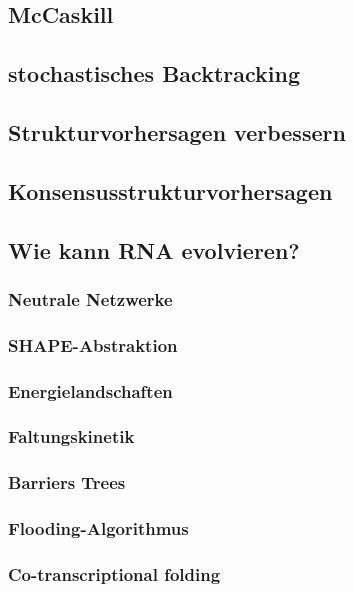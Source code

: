 \documentclass[12pt]{article}
\begin{document}
\subsection{McCaskill}

\subsection{stochastisches Backtracking}

\subsection{Strukturvorhersagen verbessern}

\subsection{Konsensusstrukturvorhersagen}

\subsection{Wie kann RNA evolvieren?}

\subsubsection{Neutrale Netzwerke}

\subsubsection{SHAPE-Abstraktion}

\subsubsection{Energielandschaften}

\subsubsection{Faltungskinetik}

\subsubsection{Barriers Trees}

\subsubsection{Flooding-Algorithmus}

\subsubsection{Co-transcriptional folding}
\end{document}
